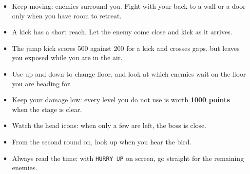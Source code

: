 \begin{itemize}
\item Keep moving: enemies surround you. Fight with your back to a wall or a door only when you have room to retreat.
\item A kick has a short reach. Let the enemy come close and kick as it arrives.
\item The jump kick scores 500 against 200 for a kick and crosses gaps, but leaves you exposed while you are in the air.
\item Use up and down to change floor, and look at which enemies wait on the floor you are heading for.
\item Keep your damage low: every level you do not use is worth \textbf{1000 points} when the stage is clear.
\item Watch the head icons: when only a few are left, the boss is close.
\item From the second round on, look up when you hear the bird.
\item Always read the time: with \texttt{HURRY UP} on screen, go straight for the remaining enemies.
\end{itemize}
